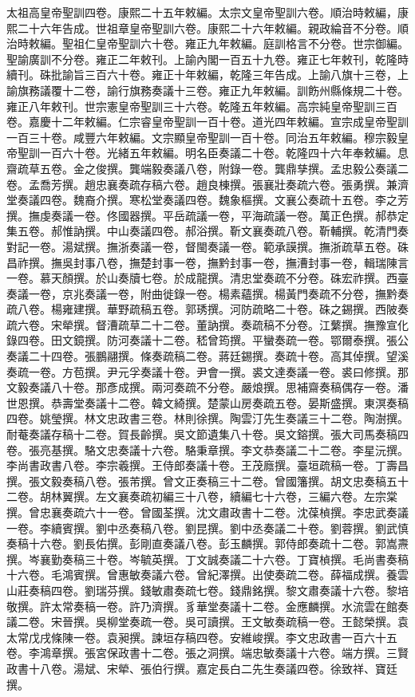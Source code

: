 \begin{pinyinscope}
太祖高皇帝聖訓四卷。康熙二十五年敕編。太宗文皇帝聖訓六卷。順治時敕編，康熙二十六年告成。世祖章皇帝聖訓六卷。康熙二十六年敕編。親政綸音不分卷。順治時敕編。聖祖仁皇帝聖訓六十卷。雍正九年敕編。庭訓格言不分卷。世宗御編。聖諭廣訓不分卷。雍正二年敕刊。上諭內閣一百五十九卷。雍正七年敕刊，乾隆時續刊。硃批諭旨三百六十卷。雍正十年敕編，乾隆三年告成。上諭八旗十三卷，上諭旗務議覆十二卷，諭行旗務奏議十三卷。雍正九年敕編。訓飭州縣條規二十卷。雍正八年敕刊。世宗憲皇帝聖訓三十六卷。乾隆五年敕編。高宗純皇帝聖訓三百卷。嘉慶十二年敕編。仁宗睿皇帝聖訓一百十卷。道光四年敕編。宣宗成皇帝聖訓一百三十卷。咸豐六年敕編。文宗顯皇帝聖訓一百十卷。同治五年敕編。穆宗毅皇帝聖訓一百六十卷。光緒五年敕編。明名臣奏議二十卷。乾隆四十六年奉敕編。息齋疏草五卷。金之俊撰。龔端毅奏議八卷，附錄一卷。龔鼎孳撰。孟忠毅公奏議二卷。孟喬芳撰。趙忠襄奏疏存稿六卷。趙良棟撰。張襄壯奏疏六卷。張勇撰。兼濟堂奏議四卷。魏裔介撰。寒松堂奏議四卷。魏象樞撰。文襄公奏疏十五卷。李之芳撰。撫虔奏議一卷。佟國器撰。平岳疏議一卷，平海疏議一卷。萬正色撰。郝恭定集五卷。郝惟訥撰。中山奏議四卷。郝浴撰。靳文襄奏疏八卷。靳輔撰。乾清門奏對記一卷。湯斌撰。撫浙奏議一卷，督閩奏議一卷。範承謨撰。撫浙疏草五卷。硃昌祚撰。撫吳封事八卷，撫楚封事一卷，撫黔封事一卷，撫漕封事一卷，輯瑞陳言一卷。慕天顏撰。於山奏牘七卷。於成龍撰。清忠堂奏疏不分卷。硃宏祚撰。西臺奏議一卷，京兆奏議一卷，附曲徙錄一卷。楊素蘊撰。楊黃門奏疏不分卷，撫黔奏疏八卷。楊雍建撰。華野疏稿五卷。郭琇撰。河防疏略二十卷。硃之錫撰。西陂奏疏六卷。宋犖撰。督漕疏草二十二卷。董訥撰。奏疏稿不分卷。江蘩撰。撫豫宣化錄四卷。田文鏡撰。防河奏議十二卷。嵇曾筠撰。平蠻奏疏一卷。鄂爾泰撰。張公奏議二十四卷。張鵬翮撰。條奏疏稿二卷。蔣廷錫撰。奏疏十卷。高其倬撰。望溪奏疏一卷。方苞撰。尹元孚奏議十卷。尹會一撰。裘文達奏議一卷。裘曰修撰。那文毅奏議八十卷。那彥成撰。兩河奏疏不分卷。嚴烺撰。思補齋奏稿偶存一卷。潘世恩撰。恭壽堂奏議十二卷。韓文綺撰。楚蒙山房奏疏五卷。晏斯盛撰。東溟奏稿四卷。姚瑩撰。林文忠政書三卷。林則徐撰。陶雲汀先生奏議三十二卷。陶澍撰。耐菴奏議存稿十二卷。賀長齡撰。吳文節遺集八十卷。吳文鎔撰。張大司馬奏稿四卷。張亮基撰。駱文忠奏議十六卷。駱秉章撰。李文恭奏議二十二卷。李星沅撰。李尚書政書八卷。李宗羲撰。王侍郎奏議十卷。王茂廕撰。臺垣疏稿一卷。丁壽昌撰。張文毅奏稿八卷。張芾撰。曾文正奏稿三十二卷。曾國籓撰。胡文忠奏稿五十二卷。胡林翼撰。左文襄奏疏初編三十八卷，續編七十六卷，三編六卷。左宗棠撰。曾忠襄奏疏六十一卷。曾國荃撰。沈文肅政書十二卷。沈葆楨撰。李忠武奏議一卷。李續賓撰。劉中丞奏稿八卷。劉昆撰。劉中丞奏議二十卷。劉蓉撰。劉武慎奏稿十六卷。劉長佑撰。彭剛直奏議八卷。彭玉麟撰。郭侍郎奏疏十二卷。郭嵩燾撰。岑襄勤奏稿三十卷。岑毓英撰。丁文誠奏議二十六卷。丁寶楨撰。毛尚書奏稿十六卷。毛鴻賓撰。曾惠敏奏議六卷。曾紀澤撰。出使奏疏二卷。薛福成撰。養雲山莊奏稿四卷。劉瑞芬撰。錢敏肅奏疏七卷。錢鼎銘撰。黎文肅奏議十六卷。黎培敬撰。許太常奏稿一卷。許乃濟撰。豸華堂奏議十二卷。金應麟撰。水流雲在館奏議二卷。宋晉撰。吳柳堂奏疏一卷。吳可讀撰。王文敏奏疏稿一卷。王懿榮撰。袁太常戊戌條陳一卷。袁昶撰。諫垣存稿四卷。安維峻撰。李文忠政書一百六十五卷。李鴻章撰。張宮保政書十二卷。張之洞撰。端忠敏奏議十六卷。端方撰。三賢政書十八卷。湯斌、宋犖、張伯行撰。嘉定長白二先生奏議四卷。徐致祥、寶廷撰。


\end{pinyinscope}
